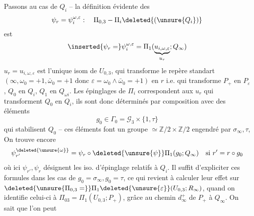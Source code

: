 Passons au cas de $Q_i$ -- la définition évidente  des
\[
\psi_r=\psi_i^{\omega,\varepsilon}:\quad\Pi_{0,3}-\Pi_i\deleted{(\unsure{Q_i})}
\]
est
\[
\inserted{\psi_r=}\psi_i^{\omega,\varepsilon}=\Pi_1(\underbrace{u_{i,\omega,\varepsilon}}_{u_r};Q_\infty)
\]
 $u_r=u_{i,\omega,\varepsilon}$ est l'unique isom de $U_{0,3}$,  qui transforme le repère  standart $(\infty,\omega_0=+1,\bar\omega_0=+1\text{ donc }\varepsilon=\omega_0\wedge\bar\omega_0=+1)$ en $r$ i.e. qui transforme $P_+$ en $P_\varepsilon$, $Q_0$ en $Q_i$, $Q_1$ en $Q_{\omega i}$.  Les épinglages   de $\Pi_i$ correspondent aux $u_r$ qui transforment $Q_0$ en $Q_i$, ils sont donc déterminés par composition avec des éléments
\[
g_0\in\Gamma_0=\mathcal G_3\times\{1,\tau\}
\]
qui stabilisent $Q_0$ -- ces éléments  font un groupe $\simeq\mathbb Z/2\times\mathbb Z/2$ engendré par $\sigma_\infty,\tau$,  On trouve encore
\[
\psi_{r'}^{\deleted{\unsure{\omega}}}=\psi_r\circ\deleted{\unsure{\psi}}\Pi_1(g_0;Q_\infty)\quad\text{si }r'=r\circ g_0
\]
où ici $\psi_{r'},\psi_r$ désignent les iso. d'épinglage relatifs à $Q_i$. Il suffit d'expliciter ces formules dans les cas de $g_0=\sigma_\infty,g_0=\tau$, ce qui revient à calculer leur effet sur $\deleted{\unsure{\Pi_{0,3}=}}\Pi_1\deleted{\unsure{\varepsilon}}(U_{0,3};R_\infty)$, quand on identifie celui-ci à $\Pi_{03}=\Pi_1(U_{0,3};P_+)$, grâce au chemin $d_\infty^+$ de $P_+$ à $Q_\infty$. On sait que l'on peut

